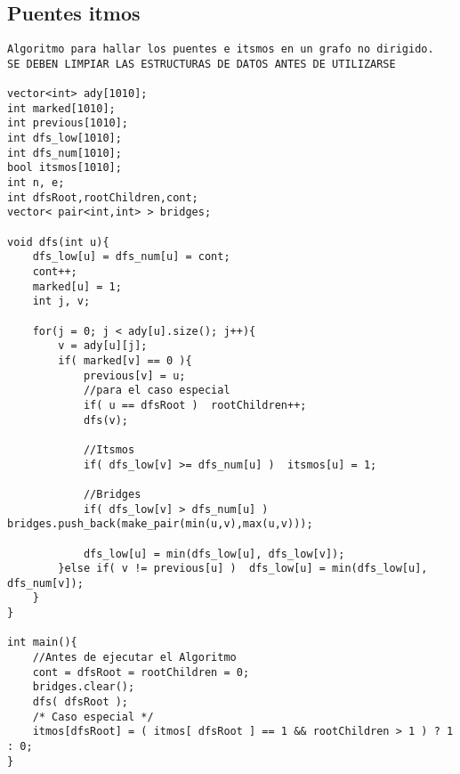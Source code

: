 \documentclass[10pt,letterpaper,twocolumn,twosided]{article}
\begin{document}
\subsection{Puentes itmos}
\begin{lstlisting}
Algoritmo para hallar los puentes e itsmos en un grafo no dirigido.
SE DEBEN LIMPIAR LAS ESTRUCTURAS DE DATOS ANTES DE UTILIZARSE

vector<int> ady[1010];
int marked[1010];
int previous[1010];
int dfs_low[1010];
int dfs_num[1010];
bool itsmos[1010];
int n, e;
int dfsRoot,rootChildren,cont;
vector< pair<int,int> > bridges;

void dfs(int u){
    dfs_low[u] = dfs_num[u] = cont;
    cont++;
    marked[u] = 1; 
    int j, v;

    for(j = 0; j < ady[u].size(); j++){
        v = ady[u][j];
        if( marked[v] == 0 ){
            previous[v] = u;
            //para el caso especial 
            if( u == dfsRoot )  rootChildren++;
            dfs(v);

            //Itsmos
            if( dfs_low[v] >= dfs_num[u] )  itsmos[u] = 1;
            
            //Bridges
            if( dfs_low[v] > dfs_num[u] ) bridges.push_back(make_pair(min(u,v),max(u,v)));
            
            dfs_low[u] = min(dfs_low[u], dfs_low[v]);
        }else if( v != previous[u] )  dfs_low[u] = min(dfs_low[u], dfs_num[v]);
    }
}

int main(){
    //Antes de ejecutar el Algoritmo
    cont = dfsRoot = rootChildren = 0;
    bridges.clear();
    dfs( dfsRoot );
    /* Caso especial */
    itmos[dfsRoot] = ( itmos[ dfsRoot ] == 1 && rootChildren > 1 ) ? 1 : 0;
}\end{lstlisting}
\end{document}

